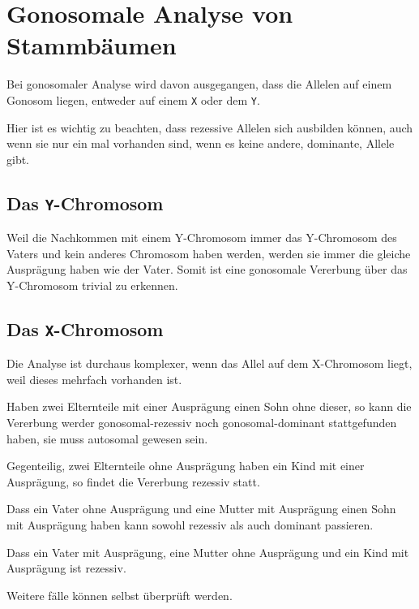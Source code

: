 \documentclass{article}
\begin{document}
\section{Gonosomale Analyse von Stammbäumen} 
Bei gonosomaler Analyse wird davon ausgegangen, dass die Allelen auf einem Gonosom liegen, entweder auf einem \texttt{X} oder dem \texttt{Y}.
 
Hier ist es wichtig zu beachten, dass rezessive Allelen sich ausbilden können, auch wenn sie nur ein mal vorhanden sind, wenn es keine andere, dominante, Allele gibt.
 
\subsection{Das \texttt{Y}-Chromosom}
Weil die Nachkommen mit einem Y-Chromosom immer das Y-Chromosom des Vaters und kein anderes Chromosom haben werden, werden sie immer die gleiche Ausprägung haben wie der Vater. Somit ist eine gonosomale Vererbung über das Y-Chromosom trivial zu erkennen.
 
\subsection{Das \texttt{X}-Chromosom}
Die Analyse ist durchaus komplexer, wenn das Allel auf dem X-Chromosom liegt, weil dieses mehrfach vorhanden ist.
 
Haben zwei Elternteile mit einer Ausprägung einen Sohn ohne dieser, so kann die Vererbung werder gonosomal-rezessiv noch gonosomal-dominant stattgefunden haben, sie muss autosomal gewesen sein.
 
Gegenteilig, zwei Elternteile ohne Ausprägung haben ein Kind mit einer Ausprägung, so findet die Vererbung rezessiv statt.
 
Dass ein Vater ohne Ausprägung und eine Mutter mit Ausprägung einen Sohn mit Ausprägung haben kann sowohl rezessiv als auch dominant passieren.

Dass ein Vater mit Ausprägung, eine Mutter ohne Ausprägung und ein Kind mit Ausprägung ist rezessiv.
 
Weitere fälle können selbst überprüft werden. 
 
\end{document}
